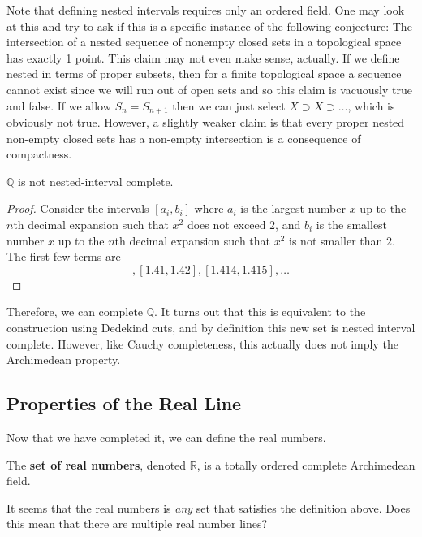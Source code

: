  Note that defining nested intervals requires only an ordered field. One may look at this and try to ask if this is a specific instance of the following conjecture: The intersection of a nested sequence of nonempty closed sets in a topological space has exactly 1 point. This claim may not even make sense, actually. If we define nested in terms of proper subsets, then for a finite topological space a sequence cannot exist since we will run out of open sets and so this claim is vacuously true and false. If we allow $S_n = S_{n+1}$ then we can just select $X \supset X \supset \ldots$, which is obviously not true. However, a slightly weaker claim is that every proper nested non-empty closed sets has a non-empty intersection is a consequence of compactness. 

  \begin{theorem}
    $\mathbb{Q}$ is not nested-interval complete. 
  \end{theorem}
  \begin{proof}
    Consider the intervals $[a_i, b_i]$ where $a_i$ is the largest number $x$ up to the $n$th decimal expansion such that $x^2$ does not exceed $2$, and $b_i$ is the smallest number $x$ up to the $n$th decimal expansion such that $x^2$ is not smaller than $2$. The first few terms are 
    \begin{equation}
      [1.4, 1.5], [1.41, 1.42], [1.414, 1.415], \ldots
    \end{equation}
  \end{proof}

  Therefore, we can complete $\mathbb{Q}$. It turns out that this is equivalent to the construction using Dedekind cuts, and by definition this new set is nested interval complete. However, like Cauchy completeness, this actually does not imply the Archimedean property. 

\subsection{Properties of the Real Line} 

  Now that we have completed it, we can define the real numbers. 

  \begin{definition}
    The \textbf{set of real numbers}, denoted $\mathbb{R}$, is a totally ordered complete Archimedean field. 
  \end{definition} 

  It seems that the real numbers is \textit{any} set that satisfies the definition above. Does this mean that there are multiple real number lines? 

